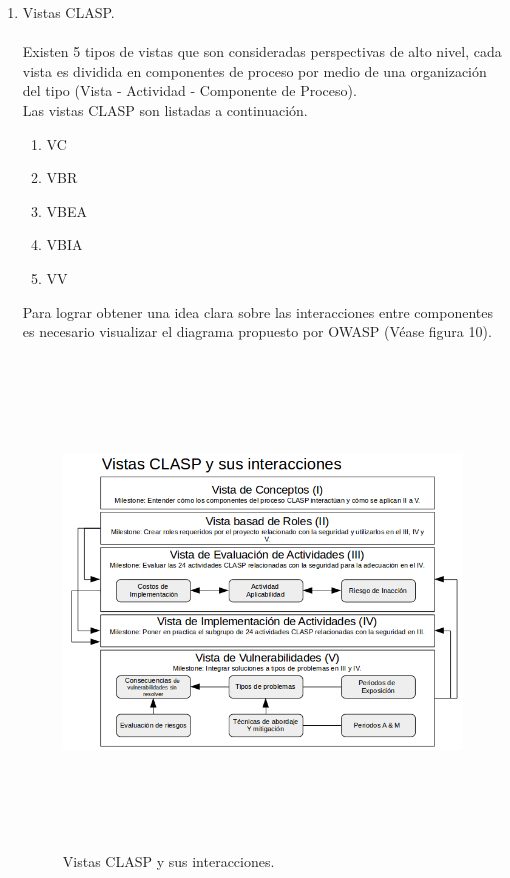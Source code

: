 \documentclass[runningheads,a4paper]{llncs}
\begin{document}
\begin{enumerate}
	\item Vistas \gls{CLASP}.\\\\
	Existen 5 tipos de vistas que son consideradas perspectivas de alto nivel, cada vista es dividida en 			componentes de proceso por medio de una organización del tipo (Vista - Actividad - Componente de 			    Proceso).\\
	
	Las vistas \gls{CLASP} son listadas a continuación.\\
	
		\begin{enumerate}
			\item \gls{VC}
			\item \gls{VBR}
			\item \gls{VBEA}
			\item \gls{VBIA}
			\item \gls{VV}\\
			
		\end{enumerate}
Para lograr obtener una idea clara sobre las interacciones entre componentes es necesario visualizar el diagrama propuesto por \gls{OWASP} (Véase figura 10).\\
	
\begin{figure}
\centering
\includegraphics[height=13.0cm, width=12.0cm]{sa_figura_10}
\caption{Vistas \gls{CLASP} y sus interacciones.}
\label{fig:example}
\end{figure}
	

\end{enumerate}
\end{document}
